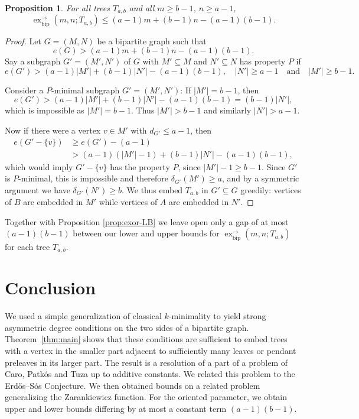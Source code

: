 \documentclass[12pt]{article}
\newtheorem{proposition}[theorem]{Proposition}
\theoremstyle{definition}
\theoremstyle{remark}
\newcommand{\exor}{\operatorname{ex}^{\rightarrow}_{\mathrm{bip}}}
\begin{document}
\begin{proposition}
\label{prop:exor-UB}
    For all trees $T_{a,b}$ and all $m\geq b-1$, $n\geq a-1$,
    \[
    \exor(m,n;T_{a,b})\leq(a-1)m+(b-1)n-(a-1)(b-1).
    \]
\end{proposition}
\begin{proof}
    Let $G=(M,N)$ be a bipartite graph such that
    \[
    e(G)>(a-1)m+(b-1)n-(a-1)(b-1).
    \]
    Say a subgraph $G'=(M',N')$ of $G$ with $M'\subseteq M$ and $N'\subseteq N$ has property $P$ if 
    \[
    e(G')>(a-1)|M'|+(b-1)|N'|-(a-1)(b-1),\quad |N'|\geq a-1\quad\text{and}\quad |M'|\geq b-1.
    \]
    
    \noindent Consider a $P$-minimal subgraph $G'=(M',N')$: If $|M'|= b-1$, then 
    \[
    e(G')>(a-1)|M'|+(b-1)|N'|-(a-1)(b-1)=(b-1)|N'|,
    \]
    which is impossible as $|M'|=b-1$. Thus $|M'|>b-1$ and similarly $|N'|>a-1$.

    Now if there were a vertex $v\in M'$ with $d_{G'}\leq a-1$, then
    \begin{align*}
        e(G'-\{v\})&\geq e(G')-(a-1)\\
        &>(a-1)(|M'|-1)+(b-1)|N'|-(a-1)(b-1),
    \end{align*}
    which would imply $G'-\{v\}$ has the property $P$, since $|M'|-1\geq b-1$. Since $G'$ is $P$-minimal, this is impossible and therefore $\delta_{G'}(M')\geq a$, and by a symmetric argument we have $\delta_{G'}(N')\geq b$. We thus embed $T_{a,b}$ in $G'\subseteq G$ greedily: vertices of $B$ are embedded in $M'$ while vertices of $A$ are embedded in $N'$. 
\end{proof}


Together with Proposition \ref{prop:exor-LB} we leave open only a gap of at most $(a-1)(b-1)$ between our lower and upper bounds for $\exor(m,n;T_{a,b})$ for each tree $T_{a,b}$.


\section{Conclusion}

We used a simple generalization of classical $k$-minimality to yield strong asymmetric degree conditions on the two sides of a bipartite graph. Theorem~\ref{thm:main} shows that these conditions are sufficient to embed trees with a vertex in the smaller part adjacent to sufficiently many leaves or pendant preleaves in its larger part. The result is a resolution of a part of a problem of Caro, Patk\'os and Tuza up to additive constants. We related this problem to the Erd\H{o}s--S\'os Conjecture. We then obtained bounds on a related problem generalizing the Zarankiewicz function. For the oriented parameter, we obtain upper and lower bounds differing by at most a constant term $(a-1)(b-1)$.
\end{document}
